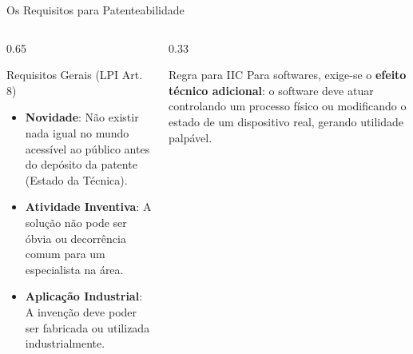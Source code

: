 \documentclass[9pt]{beamer}
\begin{document}
\begin{frame}{Os Requisitos para Patenteabilidade}
  \begin{columns}[T]
    \begin{column}{0.65\textwidth}
      \begin{block}{Requisitos Gerais (LPI Art. 8)}
        \small
        \begin{itemize}
          \item \textbf{Novidade}: Não existir nada igual no mundo acessível ao público antes do depósito da patente (Estado da Técnica).
          \item \textbf{Atividade Inventiva}: A solução não pode ser óbvia ou decorrência comum para um especialista na área.
          \item \textbf{Aplicação Industrial}: A invenção deve poder ser fabricada ou utilizada industrialmente.
        \end{itemize}
      \end{block}
    \end{column}
    
    \begin{column}{0.33\textwidth}
      \begin{block}{Regra para IIC}
        \small
        Para softwares, exige-se o \textbf{efeito técnico adicional}: o software deve atuar controlando um processo físico ou modificando o estado de um dispositivo real, gerando utilidade palpável.
      \end{block}
    \end{column}
  \end{columns}
\end{frame}
\end{document}
